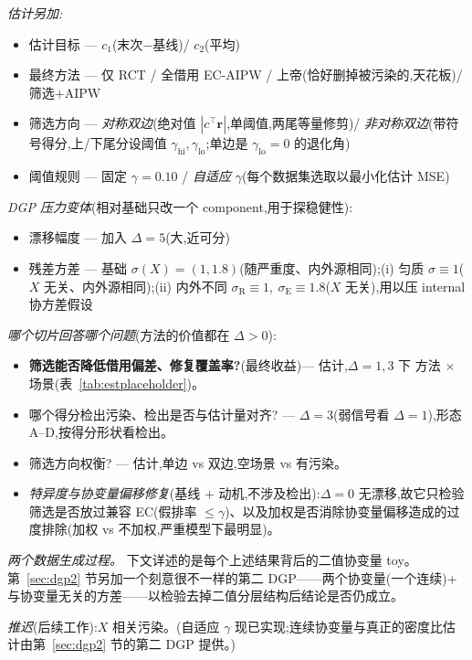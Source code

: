 \documentclass[11pt]{article}
\newcommand{\R}{\mathrm{R}}
\newcommand{\E}{\mathrm{E}}
\begin{document}
\emph{估计另加:}
\begin{itemize}
    \item 估计目标 --- $c_1$(末次$-$基线)/ $c_2$(平均)
    \item 最终方法 --- 仅 RCT / 全借用 EC-AIPW / 上帝(恰好删掉被污染的,天花板)/ 筛选$+$AIPW
    \item 筛选方向 --- \emph{对称双边}(绝对值 $|c^{\top}\bm r|$,单阈值,两尾等量修剪)/ \emph{非对称双边}(带符号得分,上/下尾分设阈值 $\gamma_{\mathrm{hi}},\gamma_{\mathrm{lo}}$;单边是 $\gamma_{\mathrm{lo}}{=}0$ 的退化角)
    \item 阈值规则 --- 固定 $\gamma{=}0.10$ / \emph{自适应} $\gamma$(每个数据集选取以最小化估计 MSE)
\end{itemize}

\emph{DGP 压力变体}(相对基础只改一个 component,用于探稳健性):
\begin{itemize}
    \item 漂移幅度 --- 加入 $\Delta{=}5$(大,近可分)
    \item 残差方差 --- 基础 $\sigma(X){=}(1,1.8)$(随严重度、内外源相同);(i) 匀质 $\sigma{\equiv}1$($X$ 无关、内外源相同);(ii) 内外不同 $\sigma_{\R}{\equiv}1,\ \sigma_{\E}{\equiv}1.8$($X$ 无关),用以压 internal 协方差假设
\end{itemize}

\emph{哪个切片回答哪个问题}(方法的价值都在 $\Delta>0$):
\begin{itemize}
    \item \textbf{筛选能否降低借用偏差、修复覆盖率?}(最终收益)--- 估计,$\Delta=1,3$ 下 方法 $\times$ 场景(表~\ref{tab:estplaceholder})。
    \item 哪个得分检出污染、检出是否与估计量对齐? --- $\Delta=3$(弱信号看 $\Delta=1$),形态 A--D,按得分形状看检出。
    \item 筛选方向权衡? --- 估计,单边 vs 双边,空场景 vs 有污染。
    \item \emph{特异度与协变量偏移修复}(基线 $+$ 动机,不涉及检出):$\Delta{=}0$ 无漂移,故它只检验筛选是否放过兼容 EC(假排率 $\le\gamma$)、以及加权是否消除协变量偏移造成的过度排除(加权 vs 不加权,严重模型下最明显)。
\end{itemize}

\emph{两个数据生成过程。} 下文详述的是每个上述结果背后的二值协变量 toy。第~\ref{sec:dgp2} 节另加一个刻意很不一样的第二 DGP——两个协变量(一个连续)+ 与协变量无关的方差——以检验去掉二值分层结构后结论是否仍成立。

\emph{推迟}(后续工作):$X$ 相关污染。(自适应 $\gamma$ 现已实现;连续协变量与真正的密度比估计由第~\ref{sec:dgp2} 节的第二 DGP 提供。)
\end{document}
